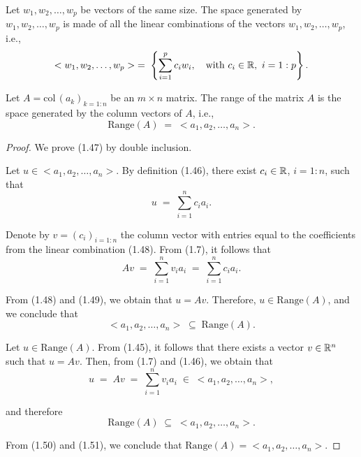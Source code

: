 \begin{definition}
Let $w_1,w_2,\ldots,w_p$ be vectors of the same size. The space generated
by $w_1, w_2, \ldots, w_p$ is made of all the linear combinations of the
vectors $w_1, w_2, \ldots, w_p$, i.e.,
\begin{equation}
<w_1,w_2,\ldots,w_p> \;=\; \left\{\sum_{i=1}^p c_iw_i, \quad \text{with}\
c_i\in\mathbb{R},\ i=1:p\right\}.
\end{equation}
\end{definition}

\begin{lemma}
Let $A = \mathrm{col}\,(a_k)_{k=1:n}$ be an $m\times n$ matrix. The range
of the matrix $A$ is the space generated by the column vectors of $A$,
i.e.,
\begin{equation}
\mathrm{Range}(A) \;=\; <a_1,a_2,\ldots,a_n>.
\end{equation}
\end{lemma}

\begin{proof}
We prove (1.47) by double inclusion.

Let $u \in <a_1,a_2,\ldots,a_n>$. By definition (1.46), there exist
$c_i\in\mathbb{R}$, $i=1:n$, such that
\begin{equation}
u \;=\; \sum_{i=1}^n c_ia_i.
\end{equation}

Denote by $v=(c_i)_{i=1:n}$ the column vector with entries equal to the
coefficients from the linear combination (1.48). From (1.7), it follows
that
\begin{equation}
Av \;=\; \sum_{i=1}^n v_ia_i \;=\; \sum_{i=1}^n c_ia_i.
\end{equation}

From (1.48) and (1.49), we obtain that $u=Av$. Therefore, $u \in
\mathrm{Range}(A)$, and we conclude that
\begin{equation}
<a_1,a_2,\ldots,a_n> \;\subseteq\; \mathrm{Range}(A).
\end{equation}

Let $u \in \mathrm{Range}(A)$. From (1.45), it follows that there exists a
vector $v\in\mathbb{R}^n$ such that $u=Av$. Then, from (1.7) and (1.46), we obtain
that
\[
u \;=\; Av \;=\; \sum_{i=1}^n v_ia_i \;\in\; <a_1,a_2,\ldots,a_n>,
\]

and therefore
\begin{equation}
\mathrm{Range}(A) \;\subseteq\; <a_1,a_2,\ldots,a_n>.
\end{equation}

From (1.50) and (1.51), we conclude that $\mathrm{Range}(A) =
<a_1,a_2,\ldots,a_n>$.
\end{proof}

